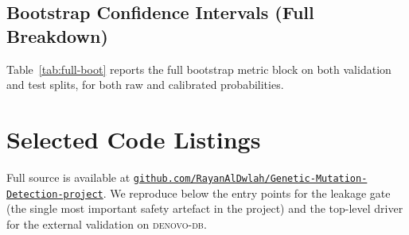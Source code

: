 \documentclass[11pt,a4paper,oneside]{report}
\begin{document}
\section{Bootstrap Confidence Intervals (Full Breakdown)}
Table~\ref{tab:full-boot} reports the full bootstrap
metric block on both validation and test splits, for
both raw and calibrated probabilities.

\begin{table}[H]
\centering
\caption[Full bootstrap CIs]{Full bootstrap CIs on
validation and test splits, raw and isotonic-
calibrated, $1{,}000$ replicates with \texttt{seed=42}.
This table is the source of the ROC/PR-AUC values
quoted in Table~\ref{tab:headline} of
Section~\ref{sec:res-headline}: the headline PR-AUC of
$0.827$ corresponds to the \texttt{test/calibrated}
row; the companion raw PR-AUC of $0.836$ corresponds
to the \texttt{test/raw} row.}
\label{tab:full-boot}
\footnotesize
{}
\end{table}

\chapter{Selected Code Listings}
\label{app:code}

Full source is available at \href{https://github.com/RayanAlDwlah/Genetic-Mutation-Detection-project}{\texttt{github.com/Ray\allowbreak anAlDwlah/\allowbreak Genetic-Mutation-\allowbreak Detection-project}}.
We reproduce below the entry points for the leakage
gate (the single most important safety artefact in
the project) and the top-level driver for the external
validation on \textsc{denovo-db}.
\end{document}

